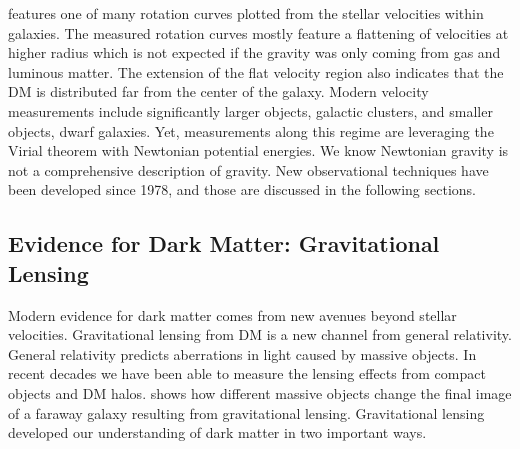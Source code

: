  features one of many rotation curves plotted from the stellar velocities within galaxies.
The measured rotation curves mostly feature a flattening of velocities at higher radius which is not expected if the gravity was only coming from gas and luminous matter.
The extension of the flat velocity region also indicates that the DM is distributed far from the center of the galaxy.
Modern velocity measurements include significantly larger objects, galactic clusters, and smaller objects, dwarf galaxies.
Yet, measurements along this regime are leveraging the Virial theorem with Newtonian potential energies.
We know Newtonian gravity is not a comprehensive description of gravity.
New observational techniques have been developed since 1978, and those are discussed in the following sections.

\subsection{Evidence for Dark Matter: Gravitational Lensing\label{sec:ev4dm_lens}}

Modern evidence for dark matter comes from new avenues beyond stellar velocities.
Gravitational lensing from DM is a new channel from general relativity.
General relativity predicts aberrations in light caused by massive objects.
In recent decades we have been able to measure the lensing effects from compact objects and DM halos.
 shows how different massive objects change the final image of a faraway galaxy resulting from gravitational lensing.
Gravitational lensing developed our understanding of dark matter in two important ways.

